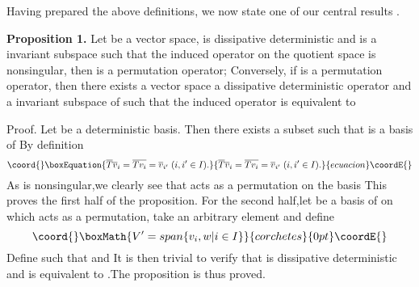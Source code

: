 \documentclass[a4paper,12pt]{article}
\begin{document}
Having prepared the above definitions, we now state one of our central
results .

\textbf{Proposition 1.} Let \coordHE{} be a vector space, \coordHE{} is
dissipative deterministic and \coordHE{} is a \coordHE{}invariant subspace such that
the induced operator \coordHE{} on the quotient space \coordHE{} is
nonsingular, then \coordHE{} is a permutation operator; Conversely, if \coordHE{}  \coordHE{} is a permutation operator, then there exists a vector space
\coordHE{}a dissipative deterministic operator \coordHE{} and a \coordHE{}invariant subspace \coordHE{} of \coordHE{} such that the induced operator \coordHE{} is equivalent to \coordHE{}

Proof. Let \coordHE{} be a \coordHE{}deterministic basis. Then there exists
a subset \coordHE{} such that \coordHE{} is a basis of \coordHE{}By definition
\begin{equation}\coord{}\boxEquation{
\overline{T}\overline{v}_i=\overline{Tv_i}=\overline{v}_{i^{\prime
}}\;(i,i^{\prime }\in I).
}{
\overline{T}\overline{v}_i=\overline{Tv_i}=\overline{v}_{i^{\prime
}}\;(i,i^{\prime }\in I).
}{ecuacion}\coordE{}\end{equation}
As \coordHE{} is nonsingular,we clearly see that \coordHE{} acts as
a permutation on the basis \coordHE{}This proves the first
half of the proposition. For the second half,let \coordHE{} be a basis
of \coordHE{} on which \coordHE{} acts as a permutation, take an arbitrary element \coordHE{} and define
\[\coord{}\boxMath{
V^{\prime }=span\{v_i,w|i\in I\}
}{corchetes}{0pt}\coordE{}\]
\coordHE{}Define \coordHE{} such that \coordHE{} and \coordHE{}It is then trivial to verify that \coordHE{} is dissipative deterministic and \coordHE{} is
equivalent to \coordHE{}.The proposition is thus proved.
\end{document}
